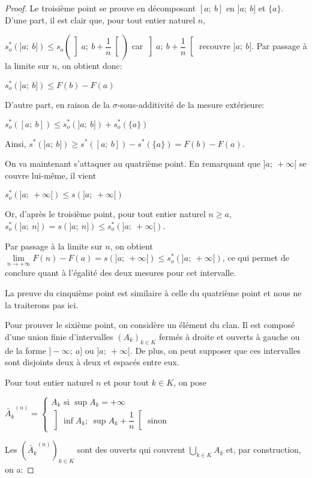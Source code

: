 \begin{proof}
Le troisième point se prouve en décomposant $[a;~b]$ en $]a;~b]$ et $\{a\}$. D'une part, il est clair que, pour tout entier naturel $n$,

$s_o^{*}(]a;~b]) \leq s_o\left(\left]a;~b+\dfrac{1}{n}\right[\right)$ car $\left]a;~b+\dfrac{1}{n}\right[$ recouvre $]a;~b]$. Par passage à la limite sur $n$, on obtient donc:

$
s_o^{*}(]a;~b]) \leq F(b) - F(a)
$

D'autre part, en raison de la $\sigma$-sous-additivité de la mesure extérieure:

$
s_o^{*}\left([a;~b]\right) \leq s_o^{*}\left(]a;~b]\right) + s_o^{*}\left(\{a\}\right)
$

Ainsi, $s^{*}\left(]a;~b]\right) \geq s^{*}\left([a;~b]\right) - s^{*}\left(\{a\}\right) = F(b)-F(a)$.

On va maintenant s'attaquer au quatrième point. En remarquant que $]a;~+\infty[$ se couvre lui-même, il vient

$
s_o^{*}\left(]a;~+\infty[\right) \leq s\left(]a;~+\infty[\right)
$

Or, d'après le troisième point, pour tout entier naturel $n \geq a$, $s_o^{*}\left(]a;~n]\right) = s\left(]a;~n]\right)\leq s_o^{*}\left(]a;~+\infty[\right)$.

Par passage à la limite sur $n$, on obtient $\lim \limits_{n \to +\infty} F(n) - F(a) = s\left(]a;~+\infty[\right) \leq s_o^{*}\left(]a;~+\infty[\right)$, ce qui permet de conclure quant à l'égalité des deux mesures pour cet intervalle.

La preuve du cinquième point est similaire à celle du quatrième point et nous ne la traiterons pas ici.

Pour prouver le sixième point, on considère un élément du clan. Il est composé d'une union finie d'intervalles $\left(A_k\right)_{k \in K}$ fermés à droite et ouverts à gauche ou de la forme $]-\infty;~a]$ ou $]a;~+\infty[$. De plus, on peut supposer que ces intervalles sont disjoints deux à deux et \og espacés \fg{} entre eux.

Pour tout entier naturel $n$ et pour tout $k \in K$, on pose 

$\widetilde{A_k}^{(n)} = \begin{cases}A_k \text{ si }\sup A_k = +\infty\\
\left]\inf A_k;~\sup A_k + \dfrac{1}{n}\right[ \text{ sinon}\end{cases}$

Les $\left(\widetilde{A_k}^{(n)}\right)_{k \in K}$ sont des ouverts qui couvrent $\bigcup \limits_{k \in K} A_k$ et, par construction, on a:


\end{proof}
